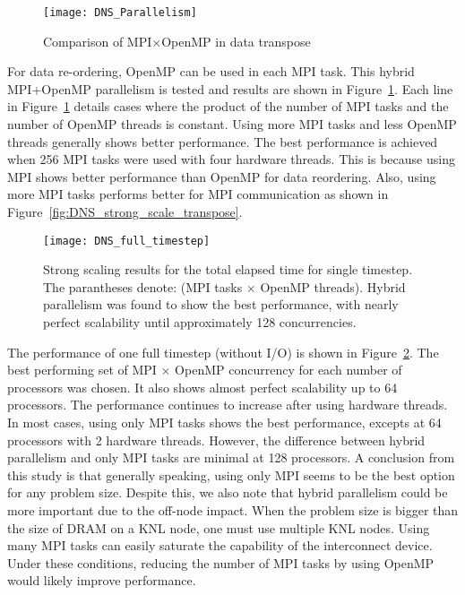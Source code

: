 \begin{figure}
 \begin{center}
   \texttt{[image: DNS\_Parallelism]}
   \caption{Comparison of MPI$\times$OpenMP in data transpose}
   \label{fig:DNS_MPI_OpenMP}
 \end{center}
\end{figure}


For data re-ordering, OpenMP can be used in each MPI task. This hybrid MPI+OpenMP parallelism
is tested and results are shown in Figure~\ref{fig:DNS_MPI_OpenMP}.
Each line in Figure~\ref{fig:DNS_MPI_OpenMP} details cases where the product of
the number of MPI tasks and the number of OpenMP threads is
constant. Using more MPI tasks and less OpenMP threads generally shows
better performance. The best performance is achieved when 256 MPI tasks
were used with four hardware threads. This is because using MPI shows
better performance than OpenMP for data reordering. Also, using more MPI
tasks performs better for MPI communication as shown in
Figure~\ref{fig:DNS_strong_scale_transpose}. 


\begin{figure}
 \begin{center}
   \texttt{[image: DNS\_full\_timestep]}
   \caption{Strong scaling results for the total elapsed time for single timestep. The parantheses denote: (MPI tasks $\times$ OpenMP threads). Hybrid parallelism was found to show the best performance, with nearly perfect scalability until approximately 128 concurrencies.}
   \label{fig:DNS_strong_scale_total_elapsed_time}
 \end{center}
\end{figure}

The performance of one full timestep (without I/O) is shown in
Figure~\ref{fig:DNS_strong_scale_total_elapsed_time}. The best
performing set of MPI $\times$ OpenMP concurrency for each number of 
processors was chosen. It also shows almost perfect scalability up to 64
processors. The performance continues to increase after using hardware
threads. In most cases, using only MPI tasks shows the best performance, 
excepts at 64 processors with 2 hardware threads. However, the
difference between hybrid parallelism and only MPI tasks are minimal at
128 processors. A conclusion from this study is that generally speaking, 
using only MPI seems to be the best option for any problem size. 
Despite this, we also note that hybrid parallelism could be more 
important due to the off-node impact. When the problem size
is bigger than the size of DRAM on a KNL node, one must use multiple KNL
nodes. Using many MPI tasks can easily saturate the capability of
the interconnect device. Under these conditions, reducing the number of MPI tasks
by using OpenMP would likely improve performance.   

